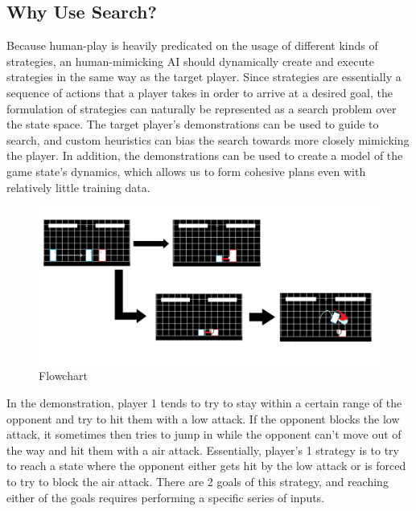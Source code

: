 \documentclass{article}
\begin{document}
\subsection{Why Use Search?}

Because human-play is heavily predicated on the usage of different kinds of strategies, an human-mimicking AI should dynamically create and execute strategies in the same way as the target player. Since strategies are essentially a sequence of actions that a player takes in order to arrive at a desired goal, the formulation of strategies can naturally be represented as a search problem over the state space. The target player's demonstrations can be used to guide to search, and custom heuristics can bias the search towards more closely mimicking the player. In addition, the demonstrations can be used to create a model of the game state's dynamics, which allows us to form cohesive plans even with relatively little training data.


\begin{figure}[h]
	\centering
	\includegraphics[width=\textwidth]{Flowchart.png}
	\caption{Flowchart}
	\label{Player Strategy}
\end{figure}

In the demonstration, player 1 tends to try to stay within a certain range of the opponent and try to hit them with a low attack. If the opponent blocks the low attack, it sometimes then tries to jump in while the opponent can't move out of the way and hit them with a air attack. Essentially, player's 1 strategy is to try to reach a state where the opponent either gets hit by the low attack or is forced to try to block the air attack. There are 2 goals of this strategy, and reaching either of the goals requires performing a specific series of inputs.
\end{document}

